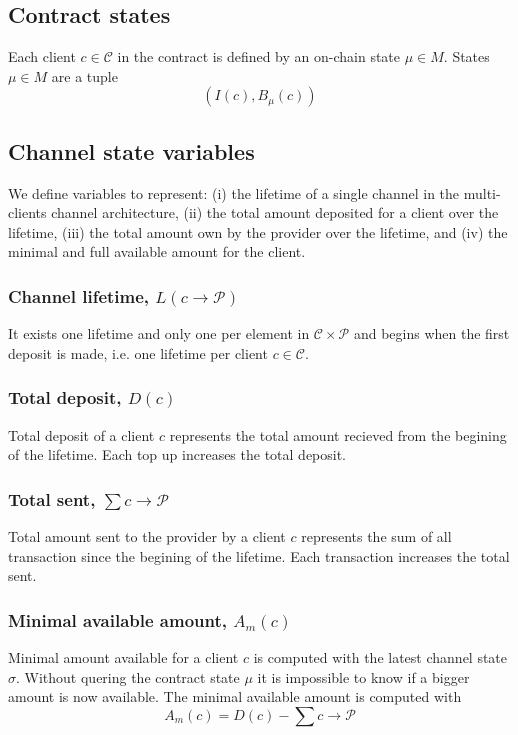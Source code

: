 \documentclass{llncs}
\begin{document}
\subsection{Contract states} Each client $c \in \mathcal{C}$ in the contract is defined by an on-chain state $\mu \in M$. States $\mu \in M$ are a tuple
$$(I(c), B_\mu(c))$$

\subsection{Channel state variables} We define variables to represent: (i) the lifetime of a single channel in the multi-clients channel architecture, (ii) the total amount deposited for a client over the lifetime, (iii) the total amount own by the provider over the lifetime, and (iv) the minimal and full available amount for the client.

\subsubsection{Channel lifetime, $L(c \rightarrow \mathcal{P})$} It exists one lifetime and only one per element in $\mathcal{C} \times \mathcal{P}$ and begins when the first deposit is made, i.e. one lifetime per client $c \in \mathcal{C}$.

\subsubsection{Total deposit, $D(c)$} Total deposit of a client $c$ represents the total amount recieved from the begining of the lifetime. Each top up increases the total deposit.

\subsubsection{Total sent, $\sum c \rightarrow \mathcal{P}$} Total amount sent to the provider by a client $c$ represents the sum of all transaction since the begining of the lifetime. Each transaction increases the total sent.

\subsubsection{Minimal available amount, $A_m(c)$} Minimal amount available for a client $c$ is computed with the latest channel state $\sigma$. Without quering the contract state $\mu$ it is impossible to know if a bigger amount is now available. The minimal available amount is computed with
$$A_m(c) = D(c) - \textstyle \sum c \rightarrow \mathcal{P}$$
\end{document}
